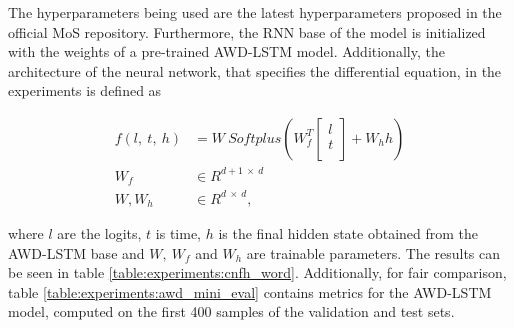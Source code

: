 The hyperparameters being used are the latest hyperparameters proposed in the official MoS repository. Furthermore, the RNN base of the model is initialized with the weights of a pre-trained AWD-LSTM model. Additionally, the architecture of the neural network, that specifies the differential equation, in the experiments is defined as

\begin{align*}
    f(l, \ t, \ h) &= W \ Softplus(W_f^T 
        \begin{bmatrix}
           l \\
           t \\
        \end{bmatrix} + W_h h) \\
        W_f &\in R^{d+1 \ \times \ d} \\ 
        W, W_h &\in R^{d \ \times \ d},
\end{align*}

where $ l $ are the logits, $ t $ is time, $ h $ is the final hidden state obtained from the AWD-LSTM base and $W, \ W_f $ and $ W_h $ are trainable parameters. The results can be seen in table \ref{table:experiments:cnfh_word}. Additionally, for fair comparison, table \ref{table:experiments:awd_mini_eval} contains metrics for the AWD-LSTM model, computed on the first 400 samples of the validation and test sets.

